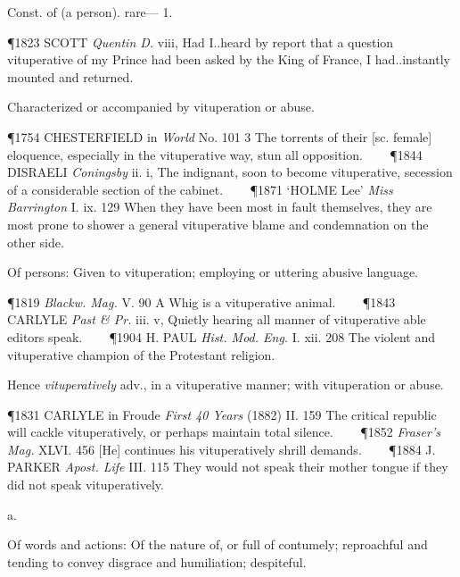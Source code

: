 \begin{description}[wide, labelwidth=!, labelindent=0pt]
\begin{myenumerate}
 Const. of (a person). rare— 1.

\P 1823 SCOTT  \textit{Quentin D.} viii, Had I..heard by report that a question vituperative of my Prince had been asked by the King of France, I had..instantly mounted and returned.

 Characterized or accompanied by vituperation or abuse.

\P 1754 CHESTERFIELD in  \textit{World} No. 101 3 The torrents of their [sc. female] eloquence, especially in the vituperative way, stun all opposition.    
\P 1844 DISRAELI  \textit{Coningsby} ii. i, The indignant, soon to become vituperative, secession of a considerable section of the cabinet.    
\P 1871 ‘HOLME Lee’ \textit{Miss Barrington} I. ix. 129 When they have been most in fault themselves, they are most prone to shower a general vituperative blame and condemnation on the other side.

 Of persons: Given to vituperation; employing or uttering abusive language.

\P 1819  \textit{Blackw. Mag.} V. 90 A Whig is a vituperative animal.    
\P 1843 CARLYLE  \textit{Past \& Pr.} iii. v, Quietly hearing all manner of vituperative able editors speak.    
\P 1904 H. PAUL  \textit{Hist. Mod. Eng.} I. xii. 208 The violent and vituperative champion of the Protestant religion.

\noindent Hence \textit{vituperatively} adv., in a vituperative manner; with vituperation or abuse.

\P 1831 CARLYLE in Froude  \textit{First 40 Years} (1882) II. 159 The critical republic will cackle vituperatively, or perhaps maintain total silence.    
\P 1852  \textit{Fraser's Mag.} XLVI. 456 [He] continues his vituperatively shrill demands.    
\P 1884 J. PARKER  \textit{Apost. Life} III. 115 They would not speak their mother tongue if they did not speak vituperatively.
\end{myenumerate}


 a.

\noindent {}

\vspace{-0.3cm}

\begin{myenumerate}

 Of words and actions: Of the nature of, or full of contumely; reproachful and tending to convey disgrace and humiliation; despiteful.


\end{myenumerate}
\end{description}
